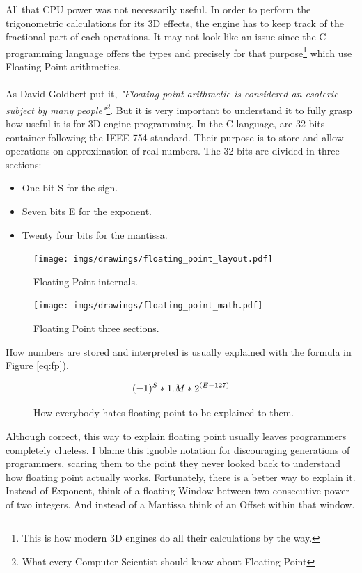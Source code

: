 \documentclass[book.tex]{subfiles}
\begin{document}
   All that CPU power was not necessarily useful. In order to perform the trigonometric calculations for its 3D effects, the engine has to keep track of the fractional part of each operations. It may not look like an issue since the C programming language offers the types  and  precisely for that purpose\footnote{This is how modern 3D engines do all their calculations by the way.} which use Floating Point arithmetics.\\
\\
As David Goldbert put it, \emph{"Floating-point arithmetic is considered an esoteric subject by many people"}\footnote{What every Computer Scientist should know about Floating-Point}. But it is very important to understand it to fully grasp how useful it is for 3D engine programming. In the C language,  are 32 bits container following the IEEE 754 standard. Their purpose is to store and allow operations on approximation of real numbers. The 32 bits are divided in three sections:\\
\begin{itemize}
  \item One bit S for the sign.
  \item Seven bits E for the exponent.
  \item Twenty four bits for the mantissa.
\end{itemize} 

\begin{figure}[H]
\centering
\texttt{[image: imgs/drawings/floating\_point\_layout.pdf]}
\caption{Floating Point internals.}
\end{figure}
  \bigskip



\begin{figure}[H]
\centering
\texttt{[image: imgs/drawings/floating\_point\_math.pdf]}
\caption{Floating Point three sections.}
\end{figure}
  \bigskip  


How numbers are stored and interpreted is usually explained with the formula in Figure \ref{eq:fp}).\

\begin{figure}[H]
\begin{equation}\label{eq:fp}
\large
(-1)^S * 1.M * 2^{(E-127)}
\end{equation}
 \caption{How everybody hates floating point to be explained to them.}
\end{figure}
\bigskip  

Although correct, this way to explain floating point usually leaves programmers completely clueless. I blame this ignoble notation for discouraging generations of programmers, scaring them to the point they never looked back to understand how floating point actually works. Fortunately, there is a better way to explain it. Instead of Exponent, think of a floating Window between two consecutive power of two integers. And instead of a Mantissa think of an Offset within that window.\\ 
\par
  
\end{document}
